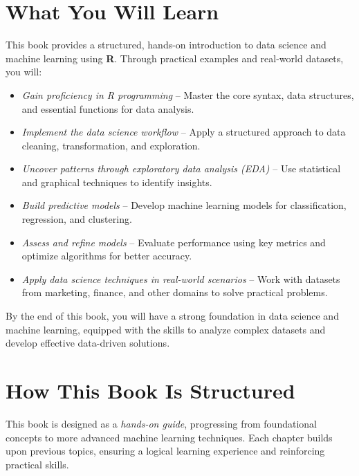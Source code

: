 \documentclass[
]{book}
\providecommand{\tightlist}{%
  \setlength{\itemsep}{0pt}\setlength{\parskip}{0pt}}
\theoremstyle{definition}
\theoremstyle{definition}
\theoremstyle{definition}
\theoremstyle{definition}
\theoremstyle{remark}
\begin{document}
\section*{What You Will Learn}\label{what-you-will-learn}

This book provides a structured, hands-on introduction to data science and machine learning using \textbf{R}. Through practical examples and real-world datasets, you will:

\begin{itemize}
\tightlist
\item
  \emph{Gain proficiency in R programming} -- Master the core syntax, data structures, and essential functions for data analysis.\\
\item
  \emph{Implement the data science workflow} -- Apply a structured approach to data cleaning, transformation, and exploration.\\
\item
  \emph{Uncover patterns through exploratory data analysis (EDA)} -- Use statistical and graphical techniques to identify insights.\\
\item
  \emph{Build predictive models} -- Develop machine learning models for classification, regression, and clustering.\\
\item
  \emph{Assess and refine models} -- Evaluate performance using key metrics and optimize algorithms for better accuracy.\\
\item
  \emph{Apply data science techniques in real-world scenarios} -- Work with datasets from marketing, finance, and other domains to solve practical problems.
\end{itemize}

By the end of this book, you will have a strong foundation in data science and machine learning, equipped with the skills to analyze complex datasets and develop effective data-driven solutions.

\section*{How This Book Is Structured}\label{how-this-book-is-structured}

This book is designed as a \emph{hands-on guide}, progressing from foundational concepts to more advanced machine learning techniques. Each chapter builds upon previous topics, ensuring a logical learning experience and reinforcing practical skills.
\end{document}
